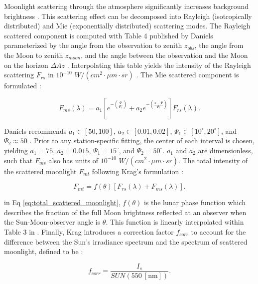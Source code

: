 Moonlight scattering through the atmosphere significantly increases background brightness \cite{krag2003}. This scattering effect can be decomposed into Rayleigh (isotropically distributed) and Mie (exponentially distributed) scattering modes. The Rayleigh scattered component is computed with Table 4 published by Daniels parameterized by the angle from the observation to zenith $z_{obs}$, the angle from the Moon to zenith $z_{moon}$, and the angle between the observation and the Moon on the horizon $\Delta Az$ \cite{daniels1977}. Interpolating this table yields the intensity of the Rayleigh scattering $F_{rs}$ in $10^{-10}$ $W/(cm^2 \cdot \mu m \cdot sr)$ \cite{krag2003}. The Mie scattered component is formulated \cite{krag2003}:

\begin{equation} \label{eq:mie_scattering_moon}
  F_{ms}(\lambda) = a_1 \left[ e^{-\left(\frac{\Psi}{\Psi_1}\right)} + a_2 e^{-\left(\frac{\pi - \Psi}{\Psi_2}\right)} \right] F_{rs}(\lambda).
\end{equation}

Daniels recommends $a_1 \in [50, 100]$, $a_2 \in [0.01, 0.02]$, $\Psi_1 \in [10^\circ, 20^\circ]$, and $\Psi_2 \approx 50$ \cite{daniels1977}. Prior to any station-specific fitting, the center of each interval is chosen, yielding $a_1 = 75$, $a_2 = 0.015$, $\Psi_1 = 15^\circ$, and $\Psi_2 = 50^\circ$. $a_1$ and $a_2$ are dimensionless, such that $F_{ms}$ also has units of $10^{-10}$ $W/(cm^2 \cdot \mu m \cdot sr)$. The total intensity of the scattered moonlight $F_{mt}$ following Krag's formulation \cite{krag2003}:

\begin{equation} \label{eq:total_scattered_moonlight}
  F_{mt} = f(\theta) \left[ F_{rs}(\lambda) + F_{ms}(\lambda) \right].
\end{equation}

in Eq \ref{eq:total_scattered_moonlight}, $f(\theta)$ is the lunar phase function which describes the fraction of the full Moon brightness reflected at an observer when the Sun-Moon-observer angle is $\theta$. This function is linearly interpolated within Table 3 in \cite{daniels1977}. Finally, Krag introduces a correction factor $f_{corr}$ to account for the difference between the Sun's irradiance spectrum and the spectrum of scattered moonlight, defined to be \cite{krag2003}:

\begin{equation} \label{eq:krag_f_corr}
  f_{corr} = \frac{I_s}{SUN(550 \: \left[\textrm{nm}\right])}.
\end{equation}

